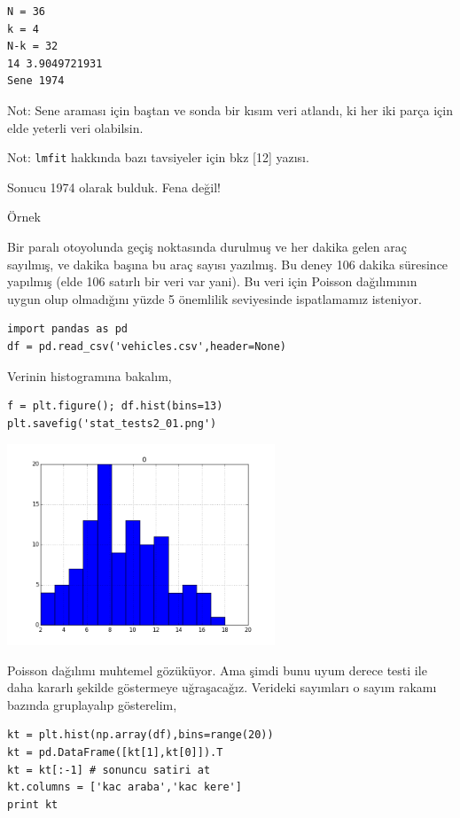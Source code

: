 \documentclass[12pt,fleqn]{article}\usepackage{../../common}
\begin{document}
\begin{verbatim}
N = 36
k = 4
N-k = 32
14 3.9049721931
Sene 1974
\end{verbatim}

Not: Sene araması için baştan ve sonda bir kısım veri atlandı, ki her iki
parça için elde yeterli veri olabilsin. 

Not: \verb!lmfit! hakkında bazı tavsiyeler için bkz [12] yazısı.

Sonucu 1974 olarak bulduk. Fena değil!


Örnek

Bir paralı otoyolunda geçiş noktasında durulmuş ve her dakika gelen araç
sayılmış, ve dakika başına bu araç sayısı yazılmış. Bu deney 106 dakika
süresince yapılmış (elde 106 satırlı bir veri var yani). Bu veri için
Poisson dağılımının uygun olup olmadığını yüzde 5 önemlilik seviyesinde
ispatlamamız isteniyor.

\begin{verbatim}
import pandas as pd
df = pd.read_csv('vehicles.csv',header=None)
\end{verbatim}

Verinin histogramına bakalım,

\begin{verbatim}
f = plt.figure(); df.hist(bins=13)
plt.savefig('stat_tests2_01.png')
\end{verbatim}

\includegraphics[height=6cm]{stat_tests2_01.png}

Poisson dağılımı muhtemel gözüküyor. Ama şimdi bunu uyum derece testi ile
daha kararlı şekilde göstermeye uğraşacağız. Verideki sayımları o sayım
rakamı bazında gruplayalıp gösterelim,

\begin{verbatim}
kt = plt.hist(np.array(df),bins=range(20))
kt = pd.DataFrame([kt[1],kt[0]]).T
kt = kt[:-1] # sonuncu satiri at
kt.columns = ['kac araba','kac kere']
print kt
\end{verbatim}
\end{document}
